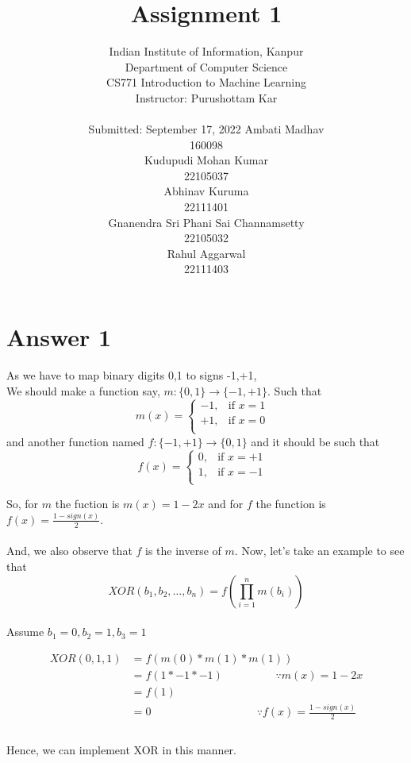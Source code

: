 \documentclass{article}
\title{Assignment 1}
\author{%
  Indian Institute of Information, Kanpur\\
  Department of Computer Science\\
  CS771 Introduction to Machine Learning\\
  Instructor: Purushottam Kar \\\\ 
  Submitted: September 17, 2022
  \AND
  Ambati Madhav  \\
 160098\\
  \And
  Kudupudi Mohan Kumar \\
  22105037 \\
   \And
  Abhinav Kuruma \\
  22111401 \\
 \AND
  Gnanendra Sri Phani Sai Channamsetty \\
  22105032 \\
  \And
  Rahul Aggarwal\\
 22111403\\
}
\begin{document}
\maketitle


\newpage
\tableofcontents
\newpage
\section{Answer 1}
As we have to map binary digits 0,1 to signs -1,+1,\\
We should make a function say, $m:\{0,1\} \to \{-1,+1\}$. Such that \\
$$
m(x)=\begin{cases}
			-1, & \text{if $x=1$ }\\
            +1, & \text{if $x=0$}\\
	   \end{cases}
$$
and another function named $f:\{-1,+1\} \to \{0,1\}$ and it should be such that \\
$$
f(x)=\begin{cases}
			0, & \text{if $x=+1$ }\\
            1, & \text{if $x=-1$}\\
		 \end{cases}
$$

So, for $m$ the fuction is $m(x) =1 -2x$ and for $f$ the function is $f(x) = \frac{1-sign(x)}{2}$.\\\\
And, we also observe that $f$ is the inverse of $m$. Now, let's take an example to see that
\begin{equation}
XOR(b_1,b_2, \dots ,b_n) = f\left( \prod_{i=1}^n m(b_i) \right)
\end{equation}
\\
Assume $b_1=0,b_2=1,b_3=1$

\begin{equation} \label{eq1}
\begin{split}
XOR(0,1,1) & = f( m(0) * m(1) * m(1) )\\
& = f(1*-1*-1) \hspace{2cm} \text{$\because$} m(x) = 1-2x\\
& = f(1)\\
& = 0  \hspace{4cm} \text {$\because$} f(x) = \frac{1-sign(x)}{2}\\
\end{split}
\end{equation}
\\
Hence, we can implement XOR in this manner.
\end{document}

